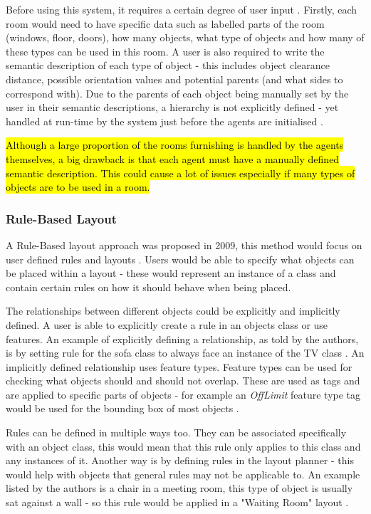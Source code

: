 Before using this system, it requires a certain degree of user input \cite{real-time-walkthroughs}. Firstly, each room would need to have specific data such as labelled parts of the room (windows, floor, doors), how many objects, what type of objects and how many of these types can be used in this room.
A user is also required to write the semantic description of each type of object - this includes object clearance distance, possible orientation values and potential parents (and what sides to correspond with).
Due to the parents of each object being manually set by the user in their semantic descriptions, a hierarchy is not explicitly defined - yet handled at run-time by the system just before the agents are initialised \cite{real-time-walkthroughs}.

\hl{Although a large proportion of the rooms furnishing is handled by the agents themselves, a big drawback is that each agent must have a manually defined semantic description. This could cause a lot of issues especially if many types of objects are to be used in a room.}

\subsubsection*{Rule-Based Layout}
A Rule-Based layout approach was proposed in 2009, this method would focus on user defined rules and layouts \cite{rule-based-layout}. Users would be able to specify what objects can be placed within a layout - these would represent an instance of a class and contain certain rules on how it should behave when being placed.

The relationships between different objects could be explicitly and implicitly defined. A user is able to explicitly create a rule in an objects class or use features. An example of explicitly defining a relationship, as told by the authors, is by setting rule for the sofa class to always face an instance of the TV class \cite{rule-based-layout}.
An implicitly defined relationship uses feature types. Feature types can be used for checking what objects should and should not overlap. These are used as tags and are applied to specific parts of objects - for example an \textit{OffLimit} feature type tag would be used for the bounding box of most objects \cite{rule-based-layout}.

Rules can be defined in multiple ways too. They can be associated specifically with an object class, this would mean that this rule only applies to this class and any instances of it.
Another way is by defining rules in the layout planner - this would help with objects that general rules may not be applicable to. An example listed by the authors is a chair in a meeting room, this type of object is usually sat against a wall - so this rule would be applied in a "Waiting Room" layout \cite{rule-based-layout}.


